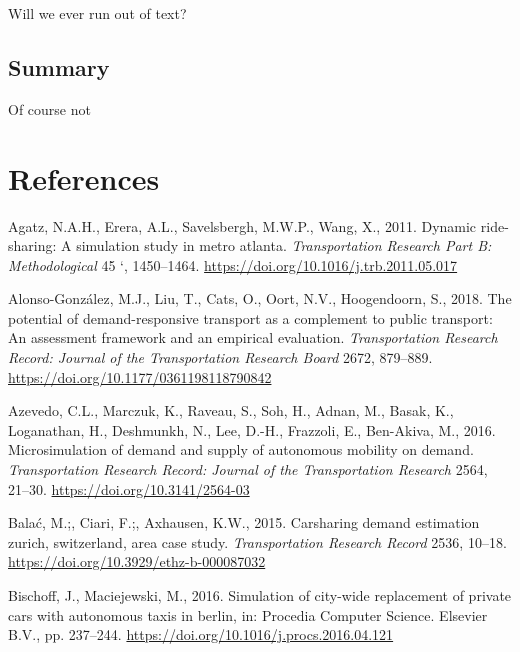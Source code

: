 \documentclass[
]{article}
\newlength{\cslhangindent}
\newlength{\cslentryspacingunit} %
\newenvironment{CSLReferences}[2] %
 {%
  \setlength{\parindent}{0pt}
  \ifodd #1
  \let\oldpar\par
  \def\par{\hangindent=\cslhangindent\oldpar}
  \fi
  \setlength{\parskip}{#2\cslentryspacingunit}
 }%
 {}
\begin{document}
Will we ever run out of text?

\hypertarget{summary-2}{%
\subsection{Summary}\label{summary-2}}

Of course not

\hypertarget{references}{%
\section*{References}\label{references}}

\hypertarget{refs}{}
\begin{CSLReferences}{1}{0}
\leavevmode{}%
Agatz, N.A.H., Erera, A.L., Savelsbergh, M.W.P., Wang, X., 2011. Dynamic ride-sharing: A simulation study in metro atlanta. \emph{Transportation Research Part B: Methodological} 45 `, 1450--1464. \url{https://doi.org/10.1016/j.trb.2011.05.017}

\leavevmode{}%
Alonso-González, M.J., Liu, T., Cats, O., Oort, N.V., Hoogendoorn, S., 2018. The potential of demand-responsive transport as a complement to public transport: An assessment framework and an empirical evaluation. \emph{Transportation Research Record: Journal of the Transportation Research Board} 2672, 879--889. \url{https://doi.org/10.1177/0361198118790842}

\leavevmode{}%
Azevedo, C.L., Marczuk, K., Raveau, S., Soh, H., Adnan, M., Basak, K., Loganathan, H., Deshmunkh, N., Lee, D.-H., Frazzoli, E., Ben-Akiva, M., 2016. Microsimulation of demand and supply of autonomous mobility on demand. \emph{Transportation Research Record: Journal of the Transportation Research} 2564, 21--30. \url{https://doi.org/10.3141/2564-03}

\leavevmode{}%
Balać, M.;, Ciari, F.;, Axhausen, K.W., 2015. Carsharing demand estimation zurich, switzerland, area case study. \emph{Transportation Research Record} 2536, 10--18. \url{https://doi.org/10.3929/ethz-b-000087032}

\leavevmode{}%
Bischoff, J., Maciejewski, M., 2016. Simulation of city-wide replacement of private cars with autonomous taxis in berlin, in: Procedia Computer Science. Elsevier B.V., pp. 237--244. \url{https://doi.org/10.1016/j.procs.2016.04.121}


\end{CSLReferences}
\end{document}
